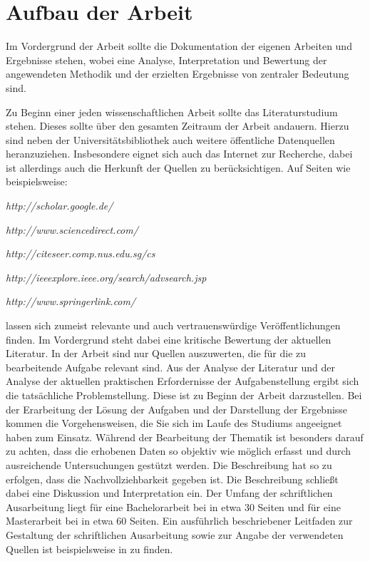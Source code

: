 \chapter{Aufbau der Arbeit}
\label{aufbau}

Im Vordergrund der Arbeit sollte die Dokumentation der eigenen
Arbeiten und Ergebnisse stehen, wobei eine Analyse, Interpretation
und Bewertung der angewendeten Methodik und der erzielten
Ergebnisse von zentraler Bedeutung sind.

Zu Beginn einer jeden wissenschaftlichen Arbeit sollte das
Literaturstudium stehen. Dieses sollte über den gesamten Zeitraum
der Arbeit andauern. Hierzu sind neben der Universitätsbibliothek
auch weitere öffentliche Datenquellen heranzuziehen. Insbesondere
eignet sich auch das Internet zur Recherche, dabei ist allerdings
auch die Herkunft der Quellen zu berücksichtigen. Auf Seiten wie
beispielsweise:

\emph{http://scholar.google.de/}

\emph{http://www.sciencedirect.com/}

\emph{http://citeseer.comp.nus.edu.sg/cs}

\emph{http://ieeexplore.ieee.org/search/advsearch.jsp}

\emph{http://www.springerlink.com/}

lassen sich zumeist relevante und auch vertrauenswürdige
Veröffentlichungen finden. Im Vordergrund steht dabei eine
kritische Bewertung der aktuellen Literatur. In der Arbeit sind
nur Quellen auszuwerten, die für die zu bearbeitende Aufgabe
relevant sind. Aus der Analyse der Literatur und der Analyse der
aktuellen praktischen Erfordernisse der Aufgabenstellung ergibt
sich die tatsächliche Problemstellung. Diese ist zu Beginn der
Arbeit darzustellen. Bei der Erarbeitung der Lösung der Aufgaben
und der Darstellung der Ergebnisse kommen die Vorgehensweisen, die
Sie sich im Laufe des Studiums angeeignet haben zum Einsatz.
Während der Bearbeitung der Thematik ist besonders darauf zu
achten, dass die erhobenen Daten so objektiv wie möglich erfasst
und durch ausreichende Untersuchungen gestützt werden. Die
Beschreibung hat so zu erfolgen, dass die Nachvollziehbarkeit
gegeben ist. Die Beschreibung schließt dabei eine Diskussion und
Interpretation ein. Der Umfang der schriftlichen Ausarbeitung
liegt für eine Bachelorarbeit bei in etwa 30 Seiten und für eine
Masterarbeit bei in etwa 60 Seiten. Ein ausführlich
beschriebener Leitfaden zur Gestaltung der schriftlichen
Ausarbeitung sowie zur Angabe der verwendeten Quellen ist
beispielsweise in \textcite{Leit1} zu finden.

